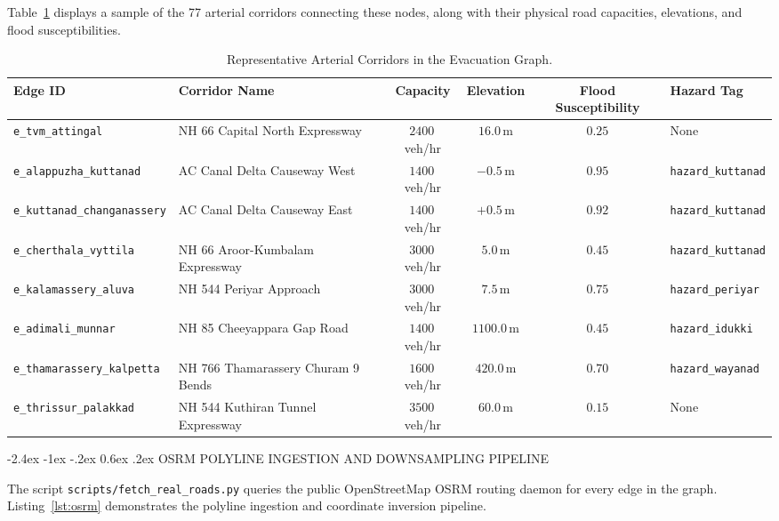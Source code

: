 \documentclass[12pt,oneside]{report}
\makeatletter
\renewcommand{\section}{\@startsection{section}{1}{\z@}%
  {-2.4ex \@plus -1ex \@minus -.2ex}%
  {0.6ex \@plus .2ex}%
  {\normalfont\large\bfseries}}
\makeatother
\begin{document}
Table~\ref{tab:edges_sample} displays a sample of the 77 arterial corridors connecting these nodes, along with their physical road capacities, elevations, and flood susceptibilities.

\begin{table}[H]
\centering
\scriptsize
\caption{Representative Arterial Corridors in the Evacuation Graph.}
\label{tab:edges_sample}
\vspace{0.05in}
\begin{tabularx}{\textwidth}{llcccl}
\toprule
\textbf{Edge ID} & \textbf{Corridor Name} & \textbf{Capacity} & \textbf{Elevation} & \textbf{Flood Susceptibility} & \textbf{Hazard Tag} \\
\midrule
\texttt{e\_tvm\_attingal} & NH 66 Capital North Expressway & $2400$\,veh/hr & $16.0$\,m & $0.25$ & None \\
\texttt{e\_alappuzha\_kuttanad} & AC Canal Delta Causeway West & $1400$\,veh/hr & $-0.5$\,m & $0.95$ & \texttt{hazard\_kuttanad} \\
\texttt{e\_kuttanad\_changanassery} & AC Canal Delta Causeway East & $1400$\,veh/hr & $+0.5$\,m & $0.92$ & \texttt{hazard\_kuttanad} \\
\texttt{e\_cherthala\_vyttila} & NH 66 Aroor-Kumbalam Expressway & $3000$\,veh/hr & $5.0$\,m & $0.45$ & \texttt{hazard\_kuttanad} \\
\texttt{e\_kalamassery\_aluva} & NH 544 Periyar Approach & $3000$\,veh/hr & $7.5$\,m & $0.75$ & \texttt{hazard\_periyar} \\
\texttt{e\_adimali\_munnar} & NH 85 Cheeyappara Gap Road & $1400$\,veh/hr & $1100.0$\,m & $0.45$ & \texttt{hazard\_idukki} \\
\texttt{e\_thamarassery\_kalpetta} & NH 766 Thamarassery Churam 9 Bends & $1600$\,veh/hr & $420.0$\,m & $0.70$ & \texttt{hazard\_wayanad} \\
\texttt{e\_thrissur\_palakkad} & NH 544 Kuthiran Tunnel Expressway & $3500$\,veh/hr & $60.0$\,m & $0.15$ & None \\
\bottomrule
\end{tabularx}
\end{table}

\section{OSRM POLYLINE INGESTION AND DOWNSAMPLING PIPELINE}

The script \texttt{scripts/fetch\_real\_roads.py} queries the public OpenStreetMap OSRM routing daemon for every edge in the graph. Listing~\ref{lst:osrm} demonstrates the polyline ingestion and coordinate inversion pipeline.
\end{document}
